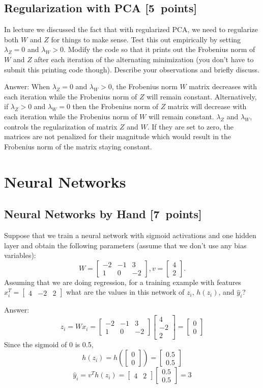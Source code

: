 \documentclass{article}
\newcommand{\blu}[1]{{\textcolor{blu}{#1}}}
\newenvironment{answer}{\par\begingroup\color{gre}Answer: }{\endgroup}
\let\ask\blu
\newcommand\pts[1]{\textcolor{pointscolour}{[#1~points]}}
\newcommand{\mat}[1]{\begin{bmatrix}#1\end{bmatrix}}
\begin{document}
\subsection{Regularization with PCA \pts{5}}

In lecture we discussed the fact that with regularized PCA, we need to regularize both $W$ and $Z$ for things to make sense. Test this out empirically by setting $\lambda_Z=0$ and $\lambda_W>0$. Modify the code so that it prints out the Frobenius norm of $W$ and $Z$ after each iteration of the alternating minimization (you don't have to submit this printing code though). \ask{Describe your observations and briefly discuss.}
\begin{answer}
    When  $\lambda_Z=0$ and $\lambda_W>0$, the Frobenius norm $W$ matrix decreases with each iteration while the Frobenius norm of $Z$ will remain constant. Alternatively, if $\lambda_Z>0$ and $\lambda_W=0$ then the Frobenius norm of $Z$ matrix will decrease with each iteration while the Frobenius norm of $W$ will remain constant. $\lambda_Z$ and $\lambda_W$, controls the regularization of matrix $Z$ and $W$. If they are set to zero, the matrices are not penalized for their magnitude which would result in the Frobenius norm of the matrix staying constant.
\end{answer}

\newpage
\section{Neural Networks}

\subsection{Neural Networks by Hand \pts{7}}

Suppose that we train a neural network with sigmoid activations and one hidden layer and obtain the following parameters (assume that we don't use any bias variables):
\[
W = \mat{-2 & -1 & 3\\1 & 0 & -2}, v = \mat{4 \\2}.
\]
Assuming that we are doing regression, \ask{for a training example with features $x_i^T = \mat{4 &-2 & 2}$ what are the values in this network of $z_i$, $h(z_i)$, and $\hat{y}_i$?}

\begin{answer}
    \[
        z_i = Wx_i = \mat{-2 & -1 & 3\\1 & 0 & -2} \mat{4 \\ -2 \\ 2} = \mat{0 \\ 0}
    \]
    Since the sigmoid of 0 is 0.5, 
    \[
        h(z_i) = h \left( \mat{0 \\ 0} \right) = \mat{0.5 \\ 0.5}
    \]
    \[
        \hat{y}_i = v^T h(z_i) = \mat{4 & 2}\mat{0.5 \\ 0.5} = 3
    \]
\end{answer}
\end{document}
